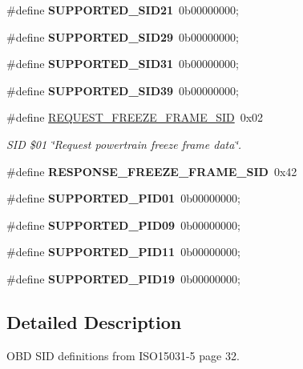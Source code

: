 \begin{DoxyCompactItemize}
\#define {\bfseries S\+U\+P\+P\+O\+R\+T\+E\+D\+\_\+\+S\+I\+D21}~0b00000000;
\item 
\mbox{\label{group__OBD__SID_ga40bc7c949434b35f067dfc21dc353a5f}} 
\#define {\bfseries S\+U\+P\+P\+O\+R\+T\+E\+D\+\_\+\+S\+I\+D29}~0b00000000;
\item 
\mbox{\label{group__OBD__SID_gaec2cdcc925fead932e14733e3c659392}} 
\#define {\bfseries S\+U\+P\+P\+O\+R\+T\+E\+D\+\_\+\+S\+I\+D31}~0b00000000;
\item 
\mbox{\label{group__OBD__SID_ga4c767ca08fe984cde1d66bbbf60a5bff}} 
\#define {\bfseries S\+U\+P\+P\+O\+R\+T\+E\+D\+\_\+\+S\+I\+D39}~0b00000000;
\item 
\mbox{\label{group__OBD__SID_ga90104c318fa205869b18cbd6ff19f4cb}} 
\#define \hyperlink{group__OBD__SID_ga90104c318fa205869b18cbd6ff19f4cb}{R\+E\+Q\+U\+E\+S\+T\+\_\+\+F\+R\+E\+E\+Z\+E\+\_\+\+F\+R\+A\+M\+E\+\_\+\+S\+ID}~0x02
\begin{DoxyCompactList}\small\item\em S\+ID \$01 \char`\"{}\+Request powertrain freeze frame data\char`\"{}. \end{DoxyCompactList}\item 
\mbox{\label{group__OBD__SID_ga30ded985a76710f1bc3709301c295717}} 
\#define {\bfseries R\+E\+S\+P\+O\+N\+S\+E\+\_\+\+F\+R\+E\+E\+Z\+E\+\_\+\+F\+R\+A\+M\+E\+\_\+\+S\+ID}~0x42
\item 
\mbox{\label{group__OBD__SID_ga3a808358cd12c12a4aeba94d0fa169b0}} 
\#define {\bfseries S\+U\+P\+P\+O\+R\+T\+E\+D\+\_\+\+P\+I\+D01}~0b00000000;
\item 
\mbox{\label{group__OBD__SID_gafabbca07d397bf294de73bc4c2e569d6}} 
\#define {\bfseries S\+U\+P\+P\+O\+R\+T\+E\+D\+\_\+\+P\+I\+D09}~0b00000000;
\item 
\mbox{\label{group__OBD__SID_ga355ac2f5aa5934728cd034ff40071831}} 
\#define {\bfseries S\+U\+P\+P\+O\+R\+T\+E\+D\+\_\+\+P\+I\+D11}~0b00000000;
\item 
\mbox{\label{group__OBD__SID_ga8dc0ebe33d68e781ad0c0fe14033a163}} 
\#define {\bfseries S\+U\+P\+P\+O\+R\+T\+E\+D\+\_\+\+P\+I\+D19}~0b00000000;
\end{DoxyCompactItemize}


\subsection{Detailed Description}
O\+BD S\+ID definitions from I\+S\+O15031-\/5 page 32. 

